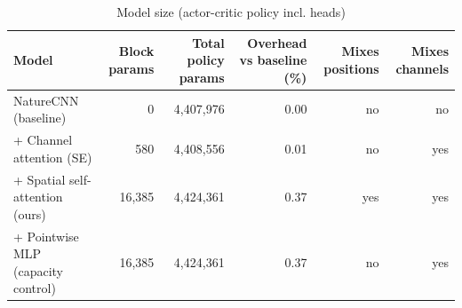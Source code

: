 \begin{table}[t]
\centering
\caption{Model size (actor-critic policy incl. heads)}
\label{tab:architecture_params}
\begin{tabular}{lrrrrr}
\toprule
Model & Block params & Total policy params & Overhead vs baseline (\%) & Mixes positions & Mixes channels \\
\midrule
NatureCNN (baseline) & 0 & 4,407,976 & 0.00 & no & no \\
+ Channel attention (SE) & 580 & 4,408,556 & 0.01 & no & yes \\
+ Spatial self-attention (ours) & 16,385 & 4,424,361 & 0.37 & yes & yes \\
+ Pointwise MLP (capacity control) & 16,385 & 4,424,361 & 0.37 & no & yes \\
\bottomrule
\end{tabular}
\end{table}
